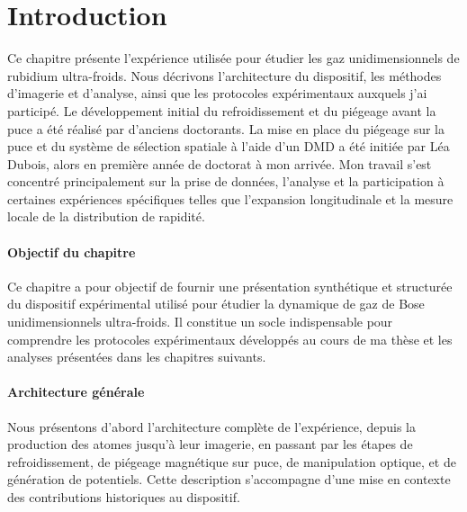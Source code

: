 \section*{Introduction}


Ce chapitre présente l’expérience utilisée pour étudier les gaz unidimensionnels de rubidium ultra-froids. Nous décrivons l’architecture du dispositif, les méthodes d’imagerie et d’analyse, ainsi que les protocoles expérimentaux auxquels j’ai participé. Le développement initial du refroidissement et du piégeage avant la puce a été réalisé par d’anciens doctorants. La mise en place du piégeage sur la puce et du système de sélection spatiale à l’aide d’un DMD a été initiée par Léa Dubois, alors en première année de doctorat à mon arrivée. Mon travail s’est concentré principalement sur la prise de données, l’analyse et la participation à certaines expériences spécifiques telles que l’expansion longitudinale et la mesure locale de la distribution de rapidité.


\paragraph{Objectif du chapitre}  
Ce chapitre a pour objectif de fournir une présentation synthétique et structurée du dispositif expérimental utilisé pour étudier la dynamique de gaz de Bose unidimensionnels ultra-froids. Il constitue un socle indispensable pour comprendre les protocoles expérimentaux développés au cours de ma thèse et les analyses présentées dans les chapitres suivants.

\paragraph{Architecture générale}  
Nous présentons d'abord l’architecture complète de l’expérience, depuis la production des atomes jusqu’à leur imagerie, en passant par les étapes de refroidissement, de piégeage magnétique sur puce, de manipulation optique, et de génération de potentiels. Cette description s’accompagne d’une mise en contexte des contributions historiques au dispositif.


